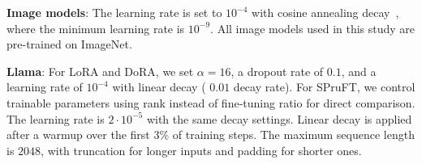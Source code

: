 
\textbf{Image models}: The learning rate is set to $10^{-4}$ with cosine annealing decay~\citep{loshchilov2017sgdr}, where the minimum learning rate is $10^{-9}$. All image models used in this study are pre-trained on ImageNet. 

\textbf{Llama}: For LoRA and DoRA, we set $\alpha = 16$, a dropout rate of $0.1$, and a learning rate of $10^{-4}$  with linear decay (
$0.01$ decay rate). For SPruFT, we control trainable parameters using rank instead of fine-tuning ratio for direct comparison. The learning rate is $2 \cdot 10^{-5}$ with the same decay settings. Linear decay is applied after a warmup over the first $3$\% of training steps. The maximum sequence length is $2048$, with truncation for longer inputs and padding for shorter ones.

